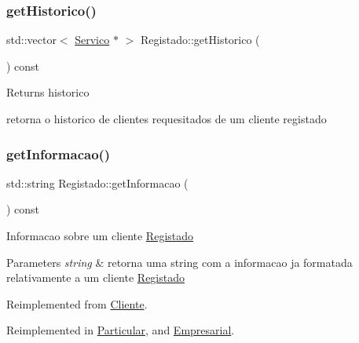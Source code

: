 \subsubsection{\texorpdfstring{get\+Historico()}{getHistorico()}}
{\footnotesize\ttfamily std\+::vector$<$ \hyperlink{class_servico}{Servico} $\ast$ $>$ Registado\+::get\+Historico (\begin{DoxyParamCaption}{ }\end{DoxyParamCaption}) const}

\begin{DoxyReturn}{Returns}
historico
\end{DoxyReturn}
retorna o historico de clientes requesitados de um cliente registado \mbox{\label{class_registado_a7017f0d74afd44459c3d6affcb303d52}} 
\subsubsection{\texorpdfstring{get\+Informacao()}{getInformacao()}}
{\footnotesize\ttfamily std\+::string Registado\+::get\+Informacao (\begin{DoxyParamCaption}{ }\end{DoxyParamCaption}) const\hspace{0.3cm}{\ttfamily [virtual]}}

Informacao sobre um cliente \hyperlink{class_registado}{Registado}


\begin{DoxyParams}{Parameters}
{\em string} & retorna uma string com a informacao ja formatada relativamente a um cliente \hyperlink{class_registado}{Registado} \\
\hline
\end{DoxyParams}


Reimplemented from \hyperlink{class_cliente_a932ef71b2792dc5df153f82d3e81a6f3}{Cliente}.



Reimplemented in \hyperlink{class_particular_acde85dcb3d26ca3afe131fb4c35763c8}{Particular}, and \hyperlink{class_empresarial_a28090b6b3db16b6b7ba03d6308c2c309}{Empresarial}.

\mbox{\label{class_registado_a15109adc7cd6a8834bd2ef909bcde008}} 
